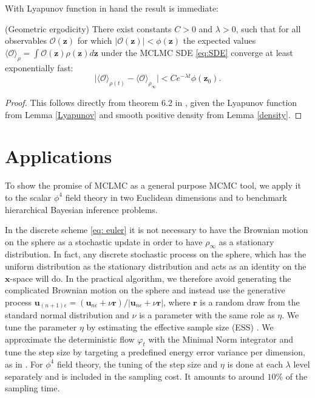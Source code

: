 \documentclass[tablecaption=bottom,wcp]{jmlr} %
\newcommand{\x}{\boldsymbol{x}}
\newcommand{\U}{\boldsymbol{u}}
\newcommand{\Z}{\boldsymbol{z}}
\begin{document}
With Lyapunov function in hand the result is immediate:

\begin{theorem} (Geometric ergodicity) \label{geometric ergodicity}
    There exist constants $C > 0$ and $\lambda > 0$, such that for all observables $\mathcal{O}(\boldsymbol{z})$ for which $\vert \mathcal{O}(\Z) \vert < \phi(\Z)$ the expected values $\langle \mathcal{O} \rangle_{\rho} = \int \mathcal{O}(\Z) \rho(\Z) d \Z$ under the MCLMC SDE \eqref{eq:SDE} converge at least exponentially fast:
    \begin{equation}
        \vert \langle \mathcal{O} \rangle_{\rho(t)} - \langle \mathcal{O} \rangle_{\rho_{\infty}} \vert < C e^{- \lambda t} \phi(\Z_0).
    \end{equation}
\end{theorem}

\begin{proof}
    This follows directly from theorem 6.2 in \cite{MolecularDynamics}, given the Lyapunov function from Lemma \ref{Lyapunov} and smooth positive density from Lemma \ref{density}.
\end{proof}


\section{Applications} \label{phi4}
To show the promise of MCLMC as a 
general purpose MCMC tool, we apply it to 
the scalar $\phi^4$ field theory in two Euclidean dimensions
and to benchmark hierarchical Bayesian inference problems.


In the discrete scheme \eqref{eq: euler} it is not necessary to have the Brownian motion on the sphere as a stochastic update in order to have $\rho_{\infty}$ as a stationary distribution. In fact, any discrete stochastic process on the sphere, which has the uniform distribution as the stationary distribution and acts as an identity on the $\x$-space will do. In the practical algorithm, we therefore avoid generating the complicated Brownian motion on the sphere and instead use the generative process $\U_{(n+1) \epsilon} = (\U_{n \epsilon} + \nu \boldsymbol{r}) / \vert \U_{n \epsilon} + \nu \boldsymbol{r} \vert $, where $\boldsymbol{r}$ is a random draw from the standard normal distribution and $\nu$ is a parameter with the same role as $\eta$. We tune the parameter $\eta$ by estimating the effective sample size (ESS) \citep{MCHMC}. 
We approximate the deterministic flow $\varphi_t$ with the Minimal Norm integrator \citep{MinimalNorm, MCHMC} and tune the step size by targeting a predefined energy error variance per dimension, as in \citep{MCHMC}. 
For $\phi^4$ field theory, the tuning of the step size and $\eta$ is done at each $\lambda$ level separately and is included in the sampling cost. It amounts to around $10 \%$ of the sampling time.
\end{document}
